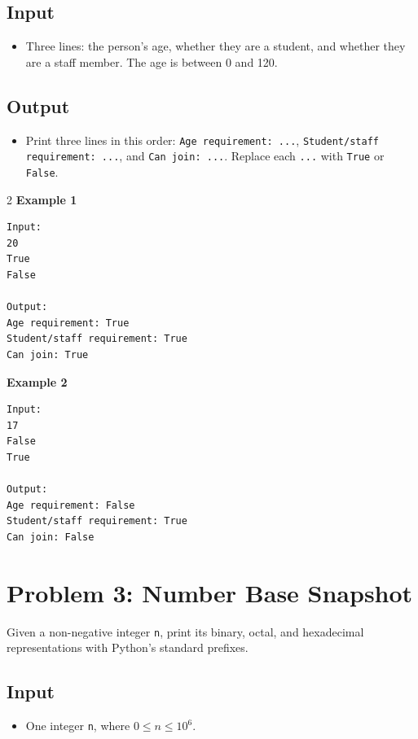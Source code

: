 \documentclass[12pt,oneside,openany]{article}
\begin{document}
\subsection*{Input}
\begin{itemize}
    \item Three lines: the person's age, whether they are a student, and whether they are a staff member. The age is between 0 and 120.
\end{itemize}

\subsection*{Output}
\begin{itemize}
    \item Print three lines in this order: \texttt{Age requirement: ...}, \texttt{Student/staff requirement: ...}, and \texttt{Can join: ...}. Replace each \texttt{...} with \texttt{True} or \texttt{False}.
\end{itemize}
\vspace{0.2cm}

\begin{example*}{}{}
\begin{multicols}{2}
\textbf{Example 1}
\begin{verbatim}
Input:
20
True
False

Output:
Age requirement: True
Student/staff requirement: True
Can join: True
\end{verbatim}
\textbf{Example 2}
\begin{verbatim}
Input:
17
False
True

Output:
Age requirement: False
Student/staff requirement: True
Can join: False
\end{verbatim}
\end{multicols}
\end{example*}
\newpage
\section*{Problem 3: Number Base Snapshot}

Given a non-negative integer \texttt{n}, print its binary, octal, and hexadecimal representations with Python's standard prefixes.

\subsection*{Input}
\begin{itemize}
    \item One integer \texttt{n}, where $0 \leq n \leq 10^6$.
\end{itemize}
\end{document}
